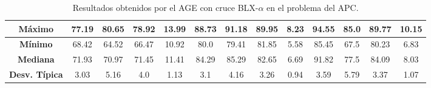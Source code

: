 \documentclass[11pt,a4paper]{article}
\begin{document}
\begin{table}[H]
{\begin{tabular}{c|c|c|c|c|c|c|c|c|c|c|c|c|}
\multicolumn{1}{|c|}{\textbf{Máximo}}       & 77.19             & 80.65                   & 78.92         & 13.99      & 88.73             & 91.18          & 89.95         & 8.23       & 94.55             & 85.0           & 89.77         & 10.15      \\ \hline
\multicolumn{1}{|c|}{\textbf{Mínimo}}       & 68.42             & 64.52                   & 66.47         & 10.92      & 80.0              & 79.41          & 81.85         & 5.58       & 85.45             & 67.5           & 80.23         & 6.83       \\ \hline
\multicolumn{1}{|c|}{\textbf{Mediana}}      & 71.93             & 70.97                   & 71.45         & 11.41      & 84.29             & 85.29          & 82.65         & 6.69       & 91.82             & 77.5           & 84.09         & 8.03       \\ \hline
\multicolumn{1}{|c|}{\textbf{Desv. Típica}} & 3.03              & 5.16                    & 4.0           & 1.13       & 3.1               & 4.16           & 3.26          & 0.94       & 3.59              & 5.79           & 3.37          & 1.07       \\ \hline
\end{tabular}
}%
\caption{Resultados obtenidos por el AGE con cruce BLX-$\alpha$ en el problema del APC.}
\end{table}
\end{document}

